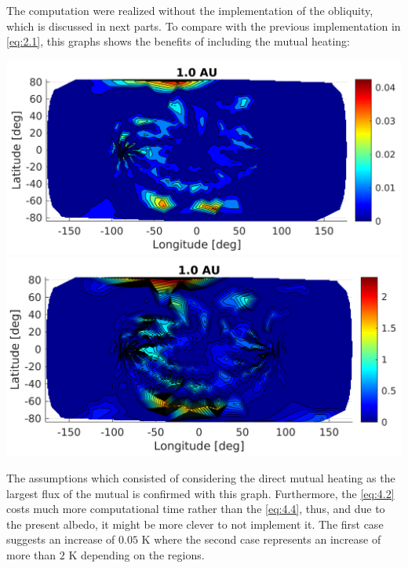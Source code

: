 The computation were realized without the implementation of the obliquity, which is discussed in next parts. To compare with the previous implementation in \autoref{eq:2.1}, this graphs shows the benefits of including the mutual heating:
\begin{center}
    \includegraphics[width=\linewidth]{rsc/mutual_W.png}
    \includegraphics[width=\linewidth]{rsc/mutual_Wu.png}
    \label{fig:4.2}
\end{center}
The assumptions which consisted of considering the direct mutual heating as the largest flux of the mutual is confirmed with this graph. Furthermore, the \autoref{eq:4.2} costs much more computational time rather than the \autoref{eq:4.4}, thus, and due to the present albedo, it might be more clever to not implement it. The first case suggests an increase of $0.05$ \si{\kelvin} where the second case represents an increase of more than $2$ \si{\kelvin} depending on the regions.
